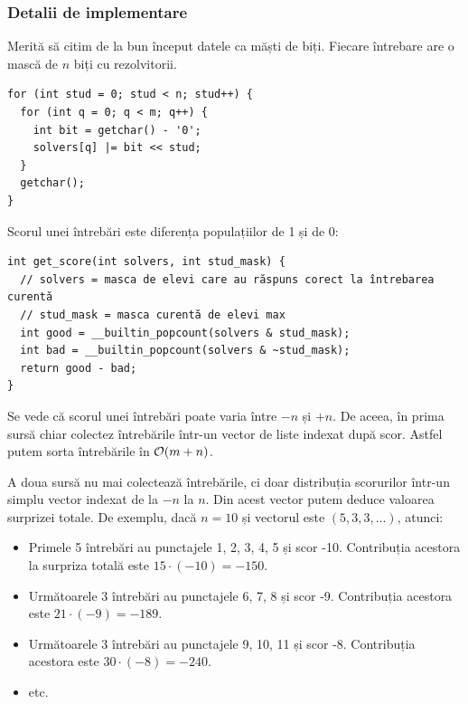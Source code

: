 \documentclass[../main.tex]{subfiles}
\begin{document}
\subsubsection*{Detalii de implementare}

Merită să citim de la bun început datele ca măști de biți. Fiecare întrebare are o mască de $n$ biți cu rezolvitorii.

\begin{verbatim}
for (int stud = 0; stud < n; stud++) {
  for (int q = 0; q < m; q++) {
    int bit = getchar() - '0';
    solvers[q] |= bit << stud;
  }
  getchar();
}
\end{verbatim}

Scorul unei întrebări este diferența populațiilor de 1 și de 0:

\begin{verbatim}
int get_score(int solvers, int stud_mask) {
  // solvers = masca de elevi care au răspuns corect la întrebarea curentă
  // stud_mask = masca curentă de elevi max
  int good = __builtin_popcount(solvers & stud_mask);
  int bad = __builtin_popcount(solvers & ~stud_mask);
  return good - bad;
}
\end{verbatim}

Se vede că scorul unei întrebări poate varia între $-n$ și $+n$. De aceea, în prima sursă chiar colectez întrebările într-un vector de liste indexat după scor. Astfel putem sorta întrebările în $\mathcal{O}(m + n)$.

A doua sursă nu mai colectează întrebările, ci doar distribuția scorurilor într-un simplu vector indexat de la $-n$ la $n$. Din acest vector putem deduce valoarea surprizei totale. De exemplu, dacă $n=10$ și vectorul este $(5, 3, 3, \dots)$, atunci:

\begin{itemize}
  \item Primele 5 întrebări au punctajele 1, 2, 3, 4, 5 și scor -10. Contribuția acestora la surpriza totală este $15 \cdot (-10) = -150$.

  \item Următoarele 3 întrebări au punctajele 6, 7, 8 și scor -9. Contribuția acestora este $21 \cdot (-9) = -189$.

  \item Următoarele 3 întrebări au punctajele 9, 10, 11 și scor -8. Contribuția acestora este $30 \cdot (-8) = -240$.

  \item etc.
\end{itemize}
\end{document}
